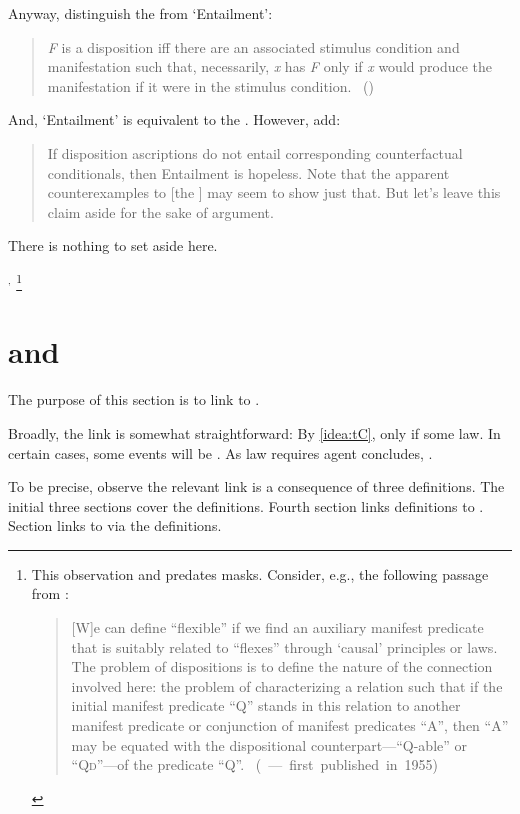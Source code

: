 \begin{note}
{    Anyway, \citeauthor{Choi:2021wg} distinguish the \dSCAa{} from `Entailment':
    \begin{quote}
      \emph{F} is a disposition iff there are an associated stimulus condition and manifestation such that, necessarily, \emph{x} has \emph{F} only if \emph{x} would produce the manifestation if it were in the stimulus condition.%
      \mbox{ }\hfill\mbox{(\citeyear[\S2.1]{Choi:2021wg})}
    \end{quote}
    And, `Entailment' is equivalent to the .
    However, \citeauthor{Choi:2021wg} add:
    \begin{quote}
      If disposition ascriptions do not entail corresponding counterfactual conditionals, then Entailment is hopeless.
      Note that the apparent counterexamples to [the \dSCA{}] may seem to show just that.
      But let's leave this claim aside for the sake of argument.
    \end{quote}
    There is nothing to set aside here.
  }%
  \(^{,}\)%
  \footnote{
    This observation and predates masks.
    Consider, e.g., the following passage from \citeauthor{Goodman:1983aa}:

    \begin{quote}
      [W]e can define ``flexible'' if we find an auxiliary manifest predicate that is suitably related to ``flexes'' through `causal' principles or laws.
      The problem of dispositions is to define the nature of the connection involved here:
      the problem of characterizing a relation such that if the initial manifest predicate ``Q'' stands in this relation to another manifest predicate or conjunction of manifest predicates ``A'', then ``A'' may be equated with the dispositional counterpart---``Q-able'' or ``Q\textsc{d}''---of the predicate ``Q''.\nolinebreak
      \mbox{ }\hfill\mbox{(\citeyear[45]{Goodman:1983aa} --- first published in 1955)}
    \end{quote}
  }
\end{note}

\section{ and }
\label{cha:typical:tCDef}

\begin{note}
  The purpose of this section is to link \tCV{} to .

  Broadly, the link is somewhat straightforward:
  By \autoref{idea:tC}, \tCV{} only if some law.
  In certain cases, some events will be .
  As law requires agent concludes, \fc{}.

  To be precise, observe the relevant link is a consequence of three definitions.
  The initial three sections cover the definitions.
  Fourth section links definitions to \tCV{}.
  Section links \tCV{} to  via the definitions.
\end{note}



